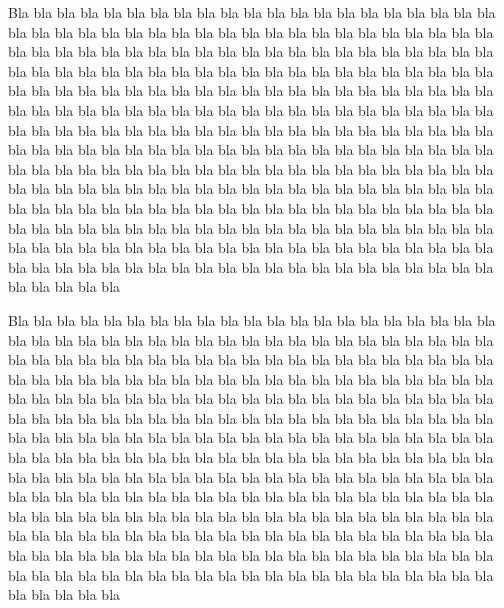 \documentclass[english]{enstaPRE}
\begin{document}
Bla bla bla bla bla bla bla bla bla bla bla bla bla bla bla bla bla bla bla bla bla bla bla bla bla bla bla bla bla bla bla bla bla bla bla bla bla bla bla bla bla bla bla bla bla bla bla bla bla bla bla bla bla bla bla bla bla bla bla bla bla bla bla bla bla bla bla bla bla bla bla bla bla bla bla bla bla bla bla bla bla bla bla bla bla bla bla bla bla bla bla bla bla bla bla bla bla bla bla bla bla bla bla bla bla bla bla bla bla bla bla bla bla bla bla bla bla bla bla bla bla bla bla bla bla bla bla bla bla bla bla bla bla bla bla bla bla bla bla bla bla bla bla bla bla bla bla bla bla bla bla bla bla bla bla bla bla bla bla bla bla bla bla bla bla bla bla bla bla bla bla bla bla bla bla bla bla bla bla bla bla bla bla bla bla bla bla bla bla bla bla bla bla bla bla bla bla bla bla bla bla bla bla bla bla bla bla bla bla bla bla bla bla bla bla bla bla bla bla bla bla bla bla bla bla bla bla bla bla bla bla bla bla bla bla bla bla bla bla bla bla bla bla bla bla bla bla bla bla bla bla bla bla bla bla bla bla bla bla bla bla bla bla bla bla bla bla bla bla bla bla bla bla bla bla bla bla bla bla bla bla bla bla bla bla bla bla bla bla bla bla bla bla bla bla bla bla bla bla 


\afficheGlossaire

\afficheIndex

\listedestables

\listedesfigures

Bla bla bla bla bla bla bla bla bla bla bla bla bla bla bla bla bla bla bla bla bla bla bla bla bla bla bla bla bla bla bla bla bla bla bla bla bla bla bla bla bla bla bla bla bla bla bla bla bla bla bla bla bla bla bla bla bla bla bla bla bla bla bla bla bla bla bla bla bla bla bla bla bla bla bla bla bla bla bla bla bla bla bla bla bla bla bla bla bla bla bla bla bla bla bla bla bla bla bla bla bla bla bla bla bla bla bla bla bla bla bla bla bla bla bla bla bla bla bla bla bla bla bla bla bla bla bla bla bla bla bla bla bla bla bla bla bla bla bla bla bla bla bla bla bla bla bla bla bla bla bla bla bla bla bla bla bla bla bla bla bla bla bla bla bla bla bla bla bla bla bla bla bla bla bla bla bla bla bla bla bla bla bla bla bla bla bla bla bla bla bla bla bla bla bla bla bla bla bla bla bla bla bla bla bla bla bla bla bla bla bla bla bla bla bla bla bla bla bla bla bla bla bla bla bla bla bla bla bla bla bla bla bla bla bla bla bla bla bla bla bla bla bla bla bla bla bla bla bla bla bla bla bla bla bla bla bla bla bla bla bla bla bla bla bla bla bla bla bla bla bla bla bla bla bla bla bla bla bla bla bla bla bla bla bla bla bla bla bla bla bla bla bla bla bla bla bla bla bla 
\end{document}

